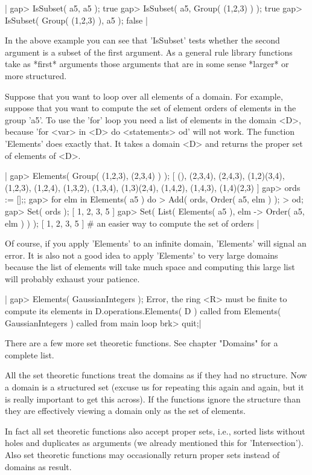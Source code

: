 |    gap> IsSubset( a5, a5 );
    true
    gap> IsSubset( a5, Group( (1,2,3) ) );
    true
    gap> IsSubset( Group( (1,2,3) ), a5 );
    false |

In the above example you can see that 'IsSubset' tests whether the second
argument is a  subset  of the first  argument.  As a  general rule {\GAP}
library functions  take as  *first* arguments those arguments that are in
some sense *larger* or more structured.

Suppose  that  you  want  to loop over all  elements  of  a domain.   For
example, suppose  that  you want to compute  the set of element orders of
elements in the group 'a5'.  To use  the 'for'  loop you  need  a list of
elements in the domain <D>, because 'for <var> in <D> do <statements> od'
will not work.  The function 'Elements'  does  exactly that.  It takes  a
domain <D> and returns the proper set of elements of <D>.

|    gap> Elements( Group( (1,2,3), (2,3,4) ) );
    [ (), (2,3,4), (2,4,3), (1,2)(3,4), (1,2,3), (1,2,4), (1,3,2),
      (1,3,4), (1,3)(2,4), (1,4,2), (1,4,3), (1,4)(2,3) ]
    gap> ords := [];;
    gap> for elm  in Elements( a5 )  do
    >        Add( ords, Order( a5, elm ) );
    >    od;
    gap> Set( ords );
    [ 1, 2, 3, 5 ]
    gap> Set( List( Elements( a5 ), elm -> Order( a5, elm ) ) );
    [ 1, 2, 3, 5 ]    # an easier way to compute the set of orders |

Of course, if you apply 'Elements' to an infinite domain, 'Elements' will
signal an error.  It is also not a good  idea to apply 'Elements' to very
large domains  because  the  list of  elements will  take  much space and
computing this large list will probably exhaust your patience.

|    gap> Elements( GaussianIntegers );
    Error, the ring <R> must be finite to compute its elements in
    D.operations.Elements( D ) called from
    Elements( GaussianIntegers ) called from
    main loop
    brk> quit;|

There are a  few more set theoretic functions.  See chapter "Domains" for
a complete list.

All  the  set theoretic functions treat  the  domains  as if they  had no
structure.  Now  a domain is  a  structured  set (excuse us for repeating
this again and again, but it is really important to get this across).  If
the functions  ignore the structure than they  are  effectively viewing a
domain only as the set of elements.

In fact all set theoretic functions also accept proper sets, i.e., sorted
lists  without holes and duplicates as arguments  (we  already  mentioned
this for 'Intersection').  Also set theoretic functions may  occasionally
return proper sets instead of domains as result.

